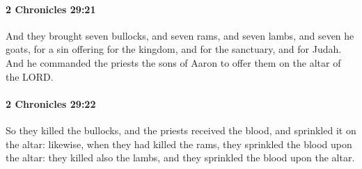 		\paragraph{2 Chronicles 29:21} %
			\label{2CHRONICLES-29-21}

			And they brought seven bullocks, and seven rams, and seven lambs, and seven he goats, for a sin offering for the kingdom, and for the sanctuary, and for Judah. And he commanded the priests the sons of Aaron to offer them on the altar of the LORD.


		\paragraph{2 Chronicles 29:22} %
			\label{2CHRONICLES-29-22}

			So they killed the bullocks, and the priests received the blood, and sprinkled it on the altar: likewise, when they had killed the rams, they sprinkled the blood upon the altar: they killed also the lambs, and they sprinkled the blood upon the altar.

